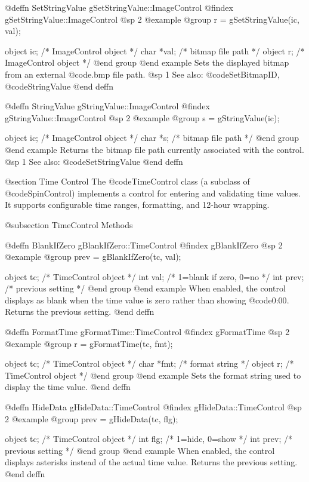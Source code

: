@deffn {SetStringValue} gSetStringValue::ImageControl
@findex gSetStringValue::ImageControl
@sp 2
@example
@group
r = gSetStringValue(ic, val);

object  ic;    /*  ImageControl object   */
char    *val;  /*  bitmap file path      */
object  r;     /*  ImageControl object   */
@end group
@end example
Sets the displayed bitmap from an external @code{.bmp} file path.
@sp 1
See also:  @code{SetBitmapID}, @code{StringValue}
@end deffn



@deffn {StringValue} gStringValue::ImageControl
@findex gStringValue::ImageControl
@sp 2
@example
@group
s = gStringValue(ic);

object  ic;   /*  ImageControl object   */
char    *s;   /*  bitmap file path      */
@end group
@end example
Returns the bitmap file path currently associated with the control.
@sp 1
See also:  @code{SetStringValue}
@end deffn




@section Time Control
The @code{TimeControl} class (a subclass of @code{SpinControl}) implements
a control for entering and validating time values.  It supports
configurable time ranges, formatting, and 12-hour wrapping.

@subsection TimeControl Methods



@deffn {BlankIfZero} gBlankIfZero::TimeControl
@findex gBlankIfZero
@sp 2
@example
@group
prev = gBlankIfZero(tc, val);

object  tc;     /*  TimeControl object     */
int     val;    /*  1=blank if zero, 0=no  */
int     prev;   /*  previous setting       */
@end group
@end example
When enabled, the control displays as blank when the time value is zero
rather than showing @code{0:00}.  Returns the previous setting.
@end deffn



@deffn {FormatTime} gFormatTime::TimeControl
@findex gFormatTime
@sp 2
@example
@group
r = gFormatTime(tc, fmt);

object  tc;    /*  TimeControl object     */
char    *fmt;  /*  format string          */
object  r;     /*  TimeControl object     */
@end group
@end example
Sets the format string used to display the time value.
@end deffn



@deffn {HideData} gHideData::TimeControl
@findex gHideData::TimeControl
@sp 2
@example
@group
prev = gHideData(tc, flg);

object  tc;     /*  TimeControl object        */
int     flg;    /*  1=hide, 0=show            */
int     prev;   /*  previous setting          */
@end group
@end example
When enabled, the control displays asterisks instead of the actual time
value.  Returns the previous setting.
@end deffn




